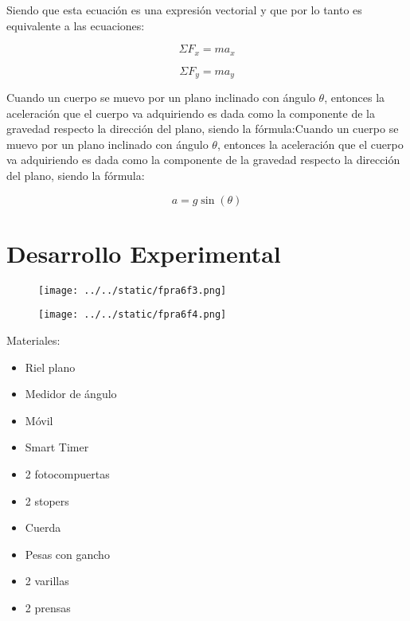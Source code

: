 \documentclass{article}
\begin{document}
\begin{multicols}{2}
Siendo que esta ecuación es una expresión vectorial y que por lo tanto es equivalente a las ecuaciones:

\begin{equation*}
	\Sigma F_x = ma_x
\end{equation*}

\begin{equation*}
	\Sigma F_y = ma_y
\end{equation*}

Cuando un cuerpo se muevo por un plano inclinado con ángulo $\theta$, entonces la aceleración que el cuerpo va adquiriendo es dada como la componente de la gravedad respecto la dirección del plano, siendo la fórmula:Cuando un cuerpo se muevo por un plano inclinado con ángulo $\theta$, entonces la aceleración que el cuerpo va adquiriendo es dada como la componente de la gravedad respecto la dirección del plano, siendo la fórmula:

\begin{equation*}
	a = g\sin(\theta)
\end{equation*}



\section{Desarrollo Experimental}\label{Desarrollo experimental}				%
\begin{figure}[H]
	\centering
	\texttt{[image: ../../static/fpra6f3.png]}
	\label{fig:3}
\end{figure}

\begin{figure}[H]
	\centering
	\texttt{[image: ../../static/fpra6f4.png]}
	\label{fig:4}
\end{figure}


Materiales:
\begin{itemize}[label=$-$]
	\item Riel plano
	\item Medidor de ángulo 
	\item Móvil
	\item Smart Timer
	\item 2 fotocompuertas
	\item 2 stopers
	\item Cuerda
	\item Pesas con gancho
	\item 2 varillas
	\item 2 prensas
\end{itemize}


\end{multicols}
\end{document}
